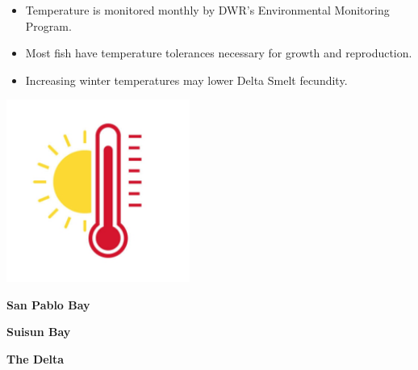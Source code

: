 \documentclass[]{article}\usepackage[]{graphicx}\usepackage[]{color}
\begin{document}
\begin{Row}
  \begin{Cell}{8}
    \begin{center}
      {\large 
        \begin{itemize}[leftmargin=2cm,rightmargin=2cm]
          \item Temperature is monitored monthly by DWR's Environmental Monitoring 
          Program.
          \item Most fish have temperature tolerances necessary for growth and 
          reproduction.
          \item Increasing winter temperatures may lower Delta Smelt fecundity.
        \end{itemize}
      }
    \end{center}
  \end{Cell}

  \begin{Cell}{2}
    \includegraphics[width=6cm,align=m]{figures/temperature/temperature_graphic.png}
  \end{Cell}
\end{Row}

\vspace{30pt}

\begin{Row}
  \begin{Cell}{4}
    \begin{center}
      {\Large {\bf San Pablo Bay}}
    \end{center}
  \end{Cell}
  \begin{Cell}{4}
    \begin{center}
      {\Large {\bf Suisun Bay}}
    \end{center}
  \end{Cell}
  \begin{Cell}{4}
    \begin{center}
      {\Large {\bf The Delta}}
    \end{center}
  \end{Cell}
\end{Row}
\end{document}
